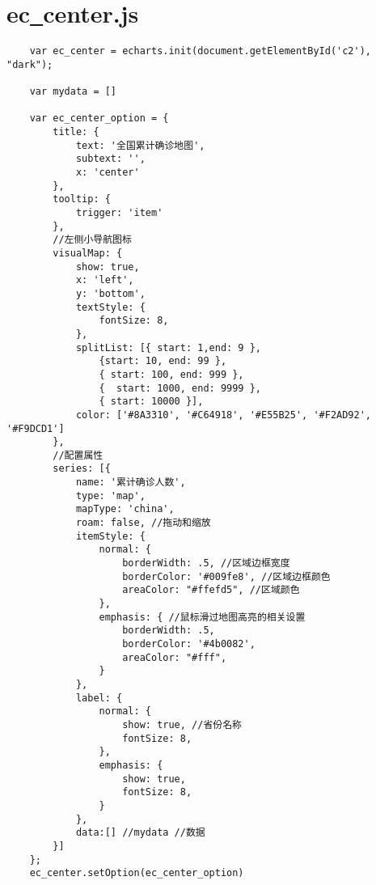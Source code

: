 \section{ec\underline{~}center.js}
\begin{lstlisting}
    var ec_center = echarts.init(document.getElementById('c2'), "dark");

    var mydata = []
    
    var ec_center_option = {
        title: {
            text: '全国累计确诊地图',
            subtext: '',
            x: 'center'
        },
        tooltip: {
            trigger: 'item'
        },
        //左侧小导航图标
        visualMap: {
            show: true,
            x: 'left',
            y: 'bottom',
            textStyle: {
                fontSize: 8,
            },
            splitList: [{ start: 1,end: 9 },
                {start: 10, end: 99 }, 
                { start: 100, end: 999 },
                {  start: 1000, end: 9999 },
                { start: 10000 }],
            color: ['#8A3310', '#C64918', '#E55B25', '#F2AD92', '#F9DCD1']
        },
        //配置属性
        series: [{
            name: '累计确诊人数',
            type: 'map',
            mapType: 'china',
            roam: false, //拖动和缩放
            itemStyle: {
                normal: {
                    borderWidth: .5, //区域边框宽度
                    borderColor: '#009fe8', //区域边框颜色
                    areaColor: "#ffefd5", //区域颜色
                },
                emphasis: { //鼠标滑过地图高亮的相关设置
                    borderWidth: .5,
                    borderColor: '#4b0082',
                    areaColor: "#fff",
                }
            },
            label: {
                normal: {
                    show: true, //省份名称
                    fontSize: 8,
                },
                emphasis: {
                    show: true,
                    fontSize: 8,
                }
            },
            data:[] //mydata //数据
        }]
    };
    ec_center.setOption(ec_center_option)
\end{lstlisting}


